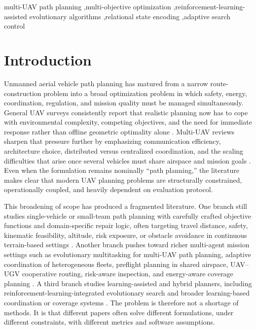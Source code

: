 \documentclass[a4paper,fleqn]{cas-dc}
\begin{document}
\begin{keywords}
multi-UAV path planning \sep multi-objective optimization \sep reinforcement-learning-assisted evolutionary algorithms \sep relational state encoding \sep adaptive search control
\end{keywords}

\maketitle

\section{Introduction}

Unmanned aerial vehicle path planning has matured from a narrow route-construction problem into a broad optimization problem in which safety, energy, coordination, regulation, and mission quality must be managed simultaneously. General UAV surveys consistently report that realistic planning now has to cope with environmental complexity, competing objectives, and the need for immediate response rather than offline geometric optimality alone \cite{ref1,ref11,ref12,ref13,ref14}. Multi-UAV reviews sharpen that pressure further by emphasizing communication efficiency, architecture choice, distributed versus centralized coordination, and the scaling difficulties that arise once several vehicles must share airspace and mission goals \cite{ref2,ref7,ref8,ref9,ref31}. Even when the formulation remains nominally ``path planning,'' the literature makes clear that modern UAV planning problems are structurally constrained, operationally coupled, and heavily dependent on evaluation protocol.

This broadening of scope has produced a fragmented literature. One branch still studies single-vehicle or small-team path planning with carefully crafted objective functions and domain-specific repair logic, often targeting travel distance, safety, kinematic feasibility, altitude, risk exposure, or obstacle avoidance in continuous terrain-based settings \cite{ref15,ref16,ref18,ref21,ref22,ref23}. Another branch pushes toward richer multi-agent mission settings such as evolutionary multitasking for multi-UAV path planning, adaptive coordination of heterogeneous fleets, preflight planning in shared airspace, UAV--UGV cooperative routing, risk-aware inspection, and energy-aware coverage planning \cite{ref19,ref24,ref25,ref26,ref27,ref28,ref30}. A third branch studies learning-assisted and hybrid planners, including reinforcement-learning-integrated evolutionary search and broader learning-based coordination or coverage systems \cite{ref29,ref3,ref4,ref5}. The problem is therefore not a shortage of methods. It is that different papers often solve different formulations, under different constraints, with different metrics and software assumptions.
\end{document}
